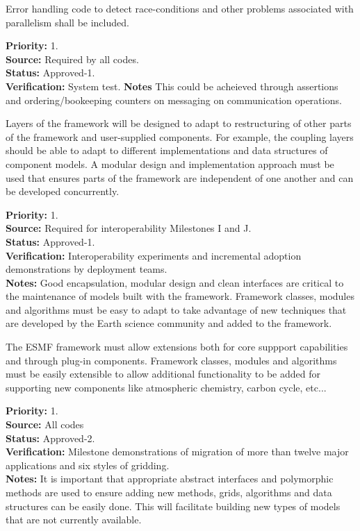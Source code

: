Error handling code to detect race-conditions and other problems associated 
with parallelism shall be included.
\label{req:gr:error_handling}
\begin{reqlist}
  {\bf Priority:} 1. \\
  {\bf Source:} Required by all codes. \\
  {\bf Status:} Approved-1. \\
  {\bf Verification:} System test.
  {\bf Notes} This could be acheieved through assertions and ordering/bookeeping
counters on messaging on communication operations.
\end{reqlist}

Layers of the framework will be designed to adapt to restructuring of
other parts of the framework and user-supplied components.  For
example, the coupling layers should be able to adapt to different
implementations and data structures of component models.
A modular design and implementation approach must be used that ensures
parts of the framework are independent of one another and can be 
developed concurrently.
\begin{reqlist}
{\bf Priority:} 1. \\
{\bf Source:} Required for interoperability Milestones I and J. \\
{\bf Status:} Approved-1. \\
{\bf Verification:} Interoperability experiments and incremental
adoption demonstrations by deployment teams.\\
{\bf Notes:} Good encapsulation, modular design and clean interfaces are critical to the
maintenance of models built with the framework. Framework classes, modules and algorithms must be
easy to adapt to take advantage of new techniques that are developed
by the Earth science community and added to the framework.
\end{reqlist}

 The ESMF framework must allow extensions both
for core suppport capabilities and through plug-in components.
Framework classes, modules and algorithms must be easily extensible
to allow additional functionality to be added for supporting new components
like atmospheric chemistry, carbon cycle, etc...
\begin{reqlist}
{\bf Priority:} 1. \\
{\bf Source:} All codes\\
{\bf Status:} Approved-2. \\
{\bf Verification:} Milestone demonstrations of migration
of more than twelve major applications and six styles of gridding.\\
{\bf Notes:} It is important that appropriate abstract interfaces and polymorphic 
methods are used to ensure adding new methods, grids, algorithms and data structures
can be easily done. This will facilitate building new types of models that are not
currently available.
\end{reqlist}

